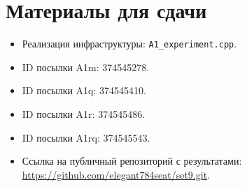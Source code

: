 \documentclass[12pt,a4paper]{article}
\begin{document}
\section*{Материалы для сдачи}
\begin{itemize}
  \item Реализация инфраструктуры: \texttt{A1\_experiment.cpp}.
  \item ID посылки A1m: 374545278.
  \item ID посылки A1q: 374545410.
  \item ID посылки A1r: 374545486.
  \item ID посылки A1rq: 374545543.
  \item Ссылка на публичный репозиторий с результатами: \url{https://github.com/elegant784seat/set9.git}.
\end{itemize}
\end{document}
